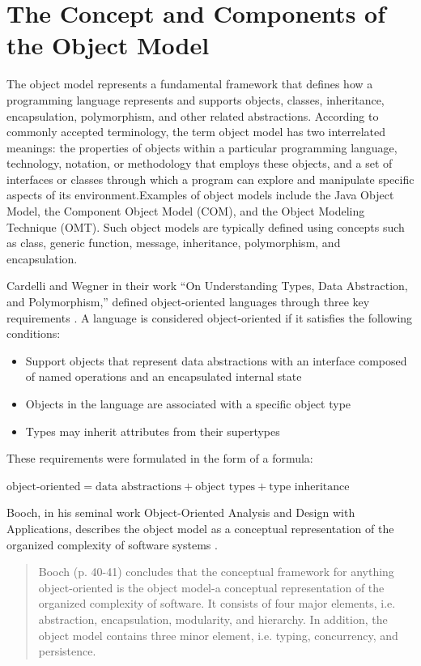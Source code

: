 \section{The Concept and Components of the Object Model}

The object model represents a fundamental framework that defines how a programming language represents and supports objects, classes, inheritance, encapsulation, polymorphism, and other related abstractions. According to commonly accepted terminology, the term object model has two interrelated meanings: the properties of objects within a particular programming language, technology, notation, or methodology that employs these objects, and a set of interfaces or classes through which a program can explore and manipulate specific aspects of its environment.Examples of object models include the Java Object Model, the Component Object Model (COM), and the Object Modeling Technique (OMT). Such object models are typically defined using concepts such as class, generic function, message, inheritance, polymorphism, and encapsulation.


Cardelli and Wegner in their work “On Understanding Types, Data Abstraction, and Polymorphism,” defined object-oriented languages through three key requirements \cite{cardelli1985understanding}. A language is considered object-oriented if it satisfies the following conditions:


\begin{itemize}
    \item Support objects that represent data abstractions with an interface composed of named operations and an encapsulated internal state
    \item Objects in the language are associated with a specific object type
    \item Types may inherit attributes from their supertypes
\end{itemize}

These requirements were formulated in the form of a formula:

$\text{object-oriented} = \text{data abstractions} + \text{object types} + \text{type inheritance}$

Booch, in his seminal work Object-Oriented Analysis and Design with Applications, describes the object model as a conceptual representation of the organized complexity of software systems \cite{booch2008object}.

\begin{quote}
    Booch (p. 40-41) concludes that the conceptual framework for anything object-oriented is the object model-a conceptual representation of the organized complexity of software. It consists of four major elements, i.e. abstraction, encapsulation, modularity, and hierarchy. In addition, the object model contains three minor element, i.e. typing, concurrency, and persistence.
\end{quote} 

